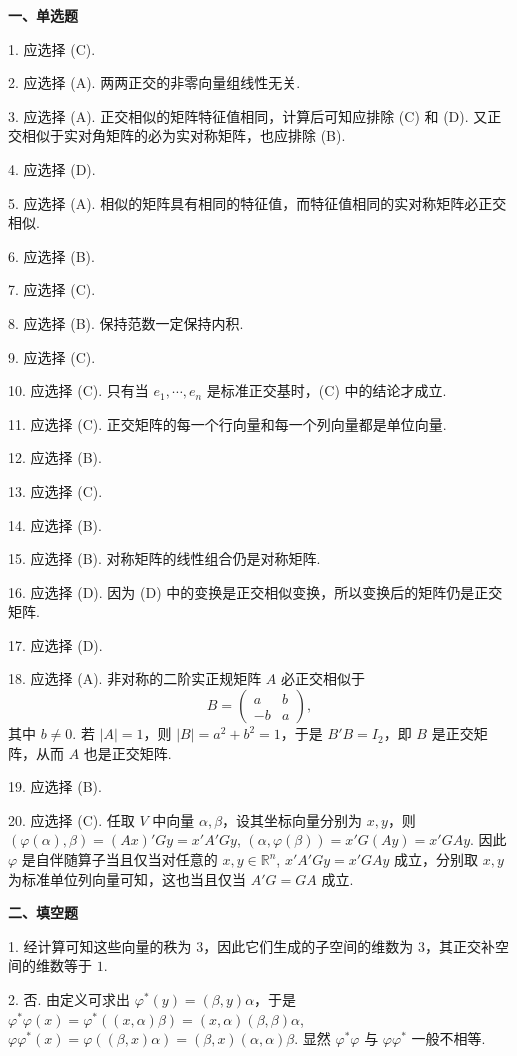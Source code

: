 \documentclass[UTF8, 12pt, fontset=fandol, oneside]{ctexart}
\begin{document}
\noindent\textbf{一、单选题}

1. 应选择 (C).

2. 应选择 (A). 两两正交的非零向量组线性无关.

3. 应选择 (A). 正交相似的矩阵特征值相同，计算后可知应排除 (C) 和 (D). 又正交相似于实对角矩阵的必为实对称矩阵，也应排除 (B).

4. 应选择 (D).

5. 应选择 (A). 相似的矩阵具有相同的特征值，而特征值相同的实对称矩阵必正交相似.

6. 应选择 (B).

7. 应选择 (C).

8. 应选择 (B). 保持范数一定保持内积.

9. 应选择 (C).

10. 应选择 (C). 只有当 $e_1,\cdots,e_n$ 是标准正交基时，(C) 中的结论才成立.

11. 应选择 (C). 正交矩阵的每一个行向量和每一个列向量都是单位向量.

12. 应选择 (B).

13. 应选择 (C).

14. 应选择 (B).

15. 应选择 (B). 对称矩阵的线性组合仍是对称矩阵.

16. 应选择 (D). 因为 (D) 中的变换是正交相似变换，所以变换后的矩阵仍是正交矩阵.

17. 应选择 (D).

18. 应选择 (A). 非对称的二阶实正规矩阵 $A$ 必正交相似于
\[
B=\begin{pmatrix}
a&b\\
-b&a
\end{pmatrix},
\]
其中 $b\ne0$. 若 $|A|=1$，则 $|B|=a^2+b^2=1$，于是 $B'B=I_2$，即 $B$ 是正交矩阵，从而 $A$ 也是正交矩阵.

19. 应选择 (B).

20. 应选择 (C). 任取 $V$ 中向量 $\alpha,\beta$，设其坐标向量分别为 $x,y$，则 $(\varphi(\alpha),\beta)=(Ax)'Gy=x'A'Gy$, $(\alpha,\varphi(\beta))=x'G(Ay)=x'GAy$. 因此 $\varphi$ 是自伴随算子当且仅当对任意的 $x,y\in\mathbb{R}^n$, $x'A'Gy=x'GAy$ 成立，分别取 $x,y$ 为标准单位列向量可知，这也当且仅当 $A'G=GA$ 成立.

\noindent\textbf{二、填空题}

1. 经计算可知这些向量的秩为 $3$，因此它们生成的子空间的维数为 $3$，其正交补空间的维数等于 $1$.

2. 否. 由定义可求出 $\varphi^*(y)=(\beta,y)\alpha$，于是 $\varphi^*\varphi(x)=\varphi^*((x,\alpha)\beta)=(x,\alpha)(\beta,\beta)\alpha$, $\varphi\varphi^*(x)=\varphi((\beta,x)\alpha)=(\beta,x)(\alpha,\alpha)\beta$. 显然 $\varphi^*\varphi$ 与 $\varphi\varphi^*$ 一般不相等.
\end{document}
